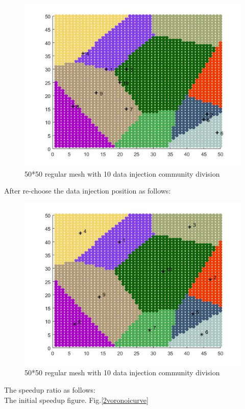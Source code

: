 \begin{figure}[h]
\centering\includegraphics[width=0.8\linewidth]{figure/2omtcell}
\caption{50*50 regular mesh with 10 data injection community division}
\label{2omtcell}
\end{figure}

After re-choose the data injection position as follows:
\\
\begin{figure}[h]
\centering\includegraphics[width=0.8\linewidth]{figure/2omtcell2}
\caption{50*50 regular mesh with 10 data injection community division}
\label{2omtcell2}
\end{figure}

The speedup ratio as follows:
\\
The initial speedup figure. Fig.\ref{2voronoicurve}

